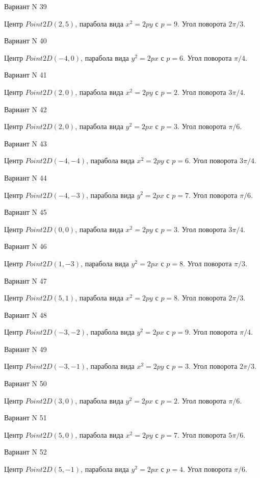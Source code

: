 \documentclass[11pt]{report}
\begin{document}
Вариант N 39

Центр $Point2D\left(2, 5\right)$, парабола вида $x^{2} = 2py$ с $p = 9$. Угол поворота $2 \pi / 3$.

Вариант N 40

Центр $Point2D\left(-4, 0\right)$, парабола вида $y^{2} = 2px$ с $p = 6$. Угол поворота $\pi / 4$.

Вариант N 41

Центр $Point2D\left(2, 0\right)$, парабола вида $x^{2} = 2py$ с $p = 2$. Угол поворота $3 \pi / 4$.

Вариант N 42

Центр $Point2D\left(2, 0\right)$, парабола вида $y^{2} = 2px$ с $p = 3$. Угол поворота $\pi / 6$.

Вариант N 43

Центр $Point2D\left(-4, -4\right)$, парабола вида $x^{2} = 2py$ с $p = 6$. Угол поворота $3 \pi / 4$.

Вариант N 44

Центр $Point2D\left(-4, -3\right)$, парабола вида $y^{2} = 2px$ с $p = 7$. Угол поворота $\pi / 6$.

Вариант N 45

Центр $Point2D\left(0, 0\right)$, парабола вида $x^{2} = 2py$ с $p = 3$. Угол поворота $3 \pi / 4$.

Вариант N 46

Центр $Point2D\left(1, -3\right)$, парабола вида $y^{2} = 2px$ с $p = 8$. Угол поворота $\pi / 3$.

Вариант N 47

Центр $Point2D\left(5, 1\right)$, парабола вида $x^{2} = 2py$ с $p = 8$. Угол поворота $2 \pi / 3$.

Вариант N 48

Центр $Point2D\left(-3, -2\right)$, парабола вида $y^{2} = 2px$ с $p = 9$. Угол поворота $\pi / 4$.

Вариант N 49

Центр $Point2D\left(-3, -1\right)$, парабола вида $x^{2} = 2py$ с $p = 3$. Угол поворота $2 \pi / 3$.

Вариант N 50

Центр $Point2D\left(3, 0\right)$, парабола вида $y^{2} = 2px$ с $p = 2$. Угол поворота $\pi / 6$.

Вариант N 51

Центр $Point2D\left(5, 0\right)$, парабола вида $x^{2} = 2py$ с $p = 7$. Угол поворота $5 \pi / 6$.

Вариант N 52

Центр $Point2D\left(5, -1\right)$, парабола вида $y^{2} = 2px$ с $p = 4$. Угол поворота $\pi / 6$.
\end{document}
